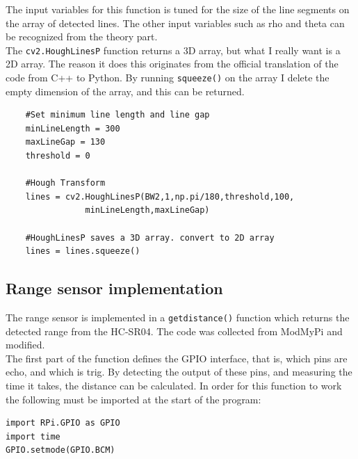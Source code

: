 The input variables for this function is tuned for the size of the line segments on the array of detected lines. The other input variables such as rho and theta can be recognized from the theory part.\\

The \texttt{cv2.HoughLinesP} function returns a 3D array, but what I really want is a 2D array. The reason it does this originates from the official translation of the code from C++ to Python. By running \texttt{squeeze()} on the array I delete the empty dimension of the array, and this can be returned.

\begin{verbatim}
    #Set minimum line length and line gap
    minLineLength = 300
    maxLineGap = 130
    threshold = 0

    #Hough Transform
    lines = cv2.HoughLinesP(BW2,1,np.pi/180,threshold,100,
    			minLineLength,maxLineGap)
    
    #HoughLinesP saves a 3D array. convert to 2D array
    lines = lines.squeeze()
\end{verbatim}

\subsection{Range sensor implementation}
The range sensor is implemented in a \texttt{getdistance()} function which returns the detected range from the HC-SR04. The code was collected from ModMyPi\cite{prange} and modified.\\

The first part of the function defines the GPIO interface, that is, which pins are echo, and which is trig. By detecting the output of these pins, and measuring the time it takes, the distance can be calculated. In order for this function to work the following must be imported at the start of the program:

\begin{verbatim}
import RPi.GPIO as GPIO
import time
GPIO.setmode(GPIO.BCM)
\end{verbatim}

